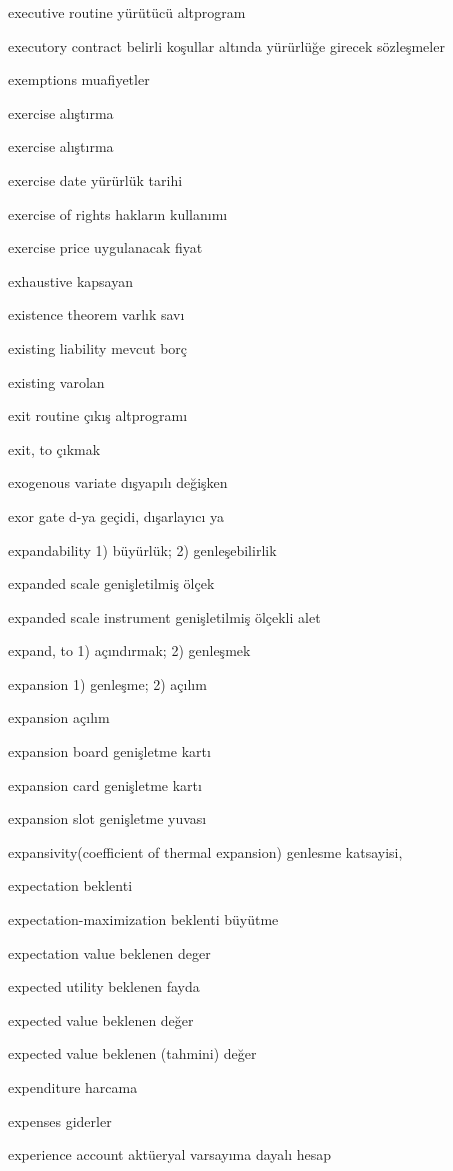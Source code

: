 \documentclass[12pt,fleqn]{article}\usepackage{../../common}
\begin{document}
executive routine yürütücü altprogram

executory contract belirli koşullar altında yürürlüğe girecek sözleşmeler

exemptions muafiyetler

exercise alıştırma

exercise alıştırma

exercise date yürürlük tarihi

exercise of rights hakların kullanımı

exercise price uygulanacak fiyat

exhaustive kapsayan

existence theorem varlık savı

existing liability mevcut borç

existing varolan

exit routine çıkış altprogramı

exit, to çıkmak

exogenous variate dışyapılı değişken

exor gate d-ya geçidi, dışarlayıcı ya

expandability 1) büyürlük; 2) genleşebilirlik

expanded scale genişletilmiş ölçek

expanded scale instrument genişletilmiş ölçekli alet

expand, to 1) açındırmak; 2) genleşmek

expansion 1) genleşme; 2) açılım

expansion açılım

expansion board genişletme kartı

expansion card genişletme kartı

expansion slot genişletme yuvası

expansivity(coefficient of thermal expansion) genlesme katsayisi,

expectation beklenti

expectation-maximization beklenti büyütme

expectation value beklenen deger

expected utility beklenen fayda

expected value beklenen değer

expected value beklenen (tahmini) değer

expenditure harcama

expenses giderler

experience account aktüeryal varsayıma dayalı hesap
\end{document}

